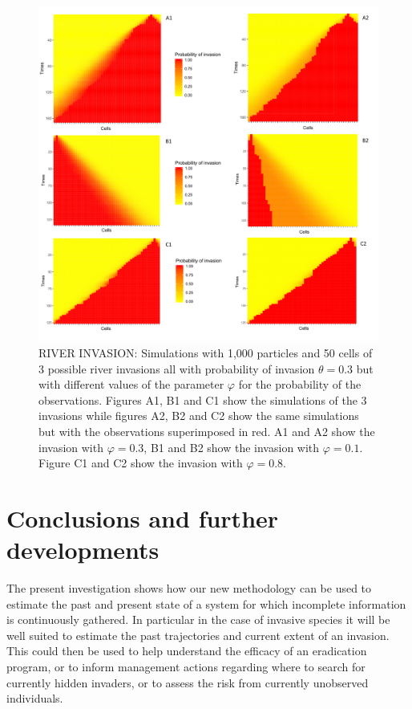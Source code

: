 \begin{figure}
    \includegraphics[width=\textwidth]{Fig7.PNG}
    \caption{RIVER INVASION: Simulations with 1,000 particles and 50 cells of 3 possible river invasions all with probability of invasion $\theta = 0.3$ but with different values of the parameter $\varphi$ for the probability of the observations. Figures A1, B1 and C1 show the simulations of the 3 invasions while figures A2, B2 and C2 show the same simulations but with the observations superimposed in red. A1 and A2 show the invasion with $\varphi = 0.3$, B1 and B2 show the invasion with $\varphi = 0.1$. Figure C1 and C2 show the invasion with $\varphi = 0.8$.}
    \label{fig:2}
\end{figure}





\section{Conclusions and further developments}
\label{sec:9}

The present investigation shows how our new methodology can be used to estimate the past and present state of a system for which incomplete information is continuously gathered. In particular in the case of invasive species it will be well suited to estimate the past trajectories and current extent of an invasion. This could then be used to help understand the efficacy of an eradication program, or to inform management actions regarding where to search for currently hidden invaders, or to assess the risk from currently unobserved individuals.

